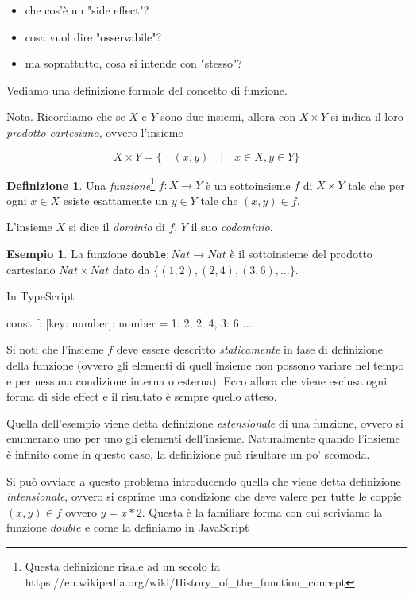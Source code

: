 \documentclass[12pt]{article}
\theoremstyle{definition}
\newtheorem{definition}{Definizione}[section]
\newtheorem{example}{Esempio}[section]
\newenvironment{code}
  {\vspace{0.5cm} \VerbatimEnvironment\begin{typescriptcode}}
  {\end{typescriptcode} \vspace{0.2cm}}
\begin{document}
\begin{itemize}
\item che cos'è un "side effect"?
\item cosa vuol dire "osservabile"?
\item ma soprattutto, cosa si intende con "stesso"?
\end{itemize}

Vediamo una definizione formale del concetto di funzione.

Nota. Ricordiamo che se $X$ e $Y$ sono due insiemi, allora con $X \times Y$ si indica il loro \emph{prodotto cartesiano}, ovvero l'insieme

$$
X \times Y = \Big\{ \quad (x, y) \quad | \quad x \in X, y \in Y \Big\}
$$

\begin{definition}
Una \emph{funzione}\footnote{Questa definizione risale ad un secolo fa https://en.wikipedia.org/wiki/History\_of\_the\_function\_concept} $f: X \rightarrow Y$ è un sottoinsieme $f$ di $X \times Y$ tale che
per ogni $x \in X$ esiste esattamente un $y \in Y$ tale che $(x, y) \in f$.
\end{definition}

L'insieme $X$ si dice il \emph{dominio} di $f$, $Y$ il suo \emph{codominio}.

\begin{example}
La funzione $\texttt{double}: Nat \rightarrow Nat$ è il sottoinsieme del prodotto cartesiano $Nat \times Nat$ dato da $\{ (1, 2), (2, 4), (3, 6), \ldots \}$.
\end{example}

In TypeScript

\begin{code}
const f: { [key: number]: number } = {
  1: 2,
  2: 4,
  3: 6
  ...
}
\end{code}

Si noti che l'insieme $f$ deve essere descritto \emph{staticamente} in fase di definizione della funzione
(ovvero gli elementi di quell'insieme non possono variare nel tempo e per nessuna condizione interna o esterna).
Ecco allora che viene esclusa ogni forma di side effect e il risultato è sempre quello atteso.

Quella dell'esempio viene detta definizione \emph{estensionale} di una funzione, ovvero si enumerano uno per uno gli elementi dell'insieme.
Naturalmente quando l'insieme è infinito come in questo caso, la definizione può risultare un po' scomoda.

Si può ovviare a questo problema introducendo quella che viene detta definizione \emph{intensionale},
ovvero si esprime una condizione che deve valere per tutte le coppie $(x, y) \in f$ ovvero $y = x * 2$. Questa è la familiare forma con cui scriviamo la funzione $double$ e come la definiamo in JavaScript
\end{document}
